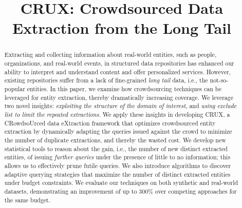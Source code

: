 \documentclass[conference]{IEEEtran}
\begin{document}

\title{CRUX: Crowdsourced Data Extraction from the Long Tail}
%

\author{
\and
{}
\and
{}
}

\maketitle

\begin{abstract}
Extracting and collecting information about real-world entities, such as people, organizations, and real-world events, in structured data repositories has enhanced our ability to interpret and understand content and offer personalized services. However, existing repositories suffer from a lack of fine-grained {\em long tail} data, i.e., the not-so-popular entities. In this paper, we examine how crowdsourcing techniques can be leveraged for entity extraction, thereby dramatically increasing coverage. We leverage two novel insights: {\em exploiting the structure of the domain of interest}, and {\em using exclude list to limit the repeated extractions}. We apply these insights in developing CRUX, a CRowdsoUrced data eXtraction framework that optimizes crowdsourced entity extraction by dynamically adapting the queries issued against the crowd to minimize the number of duplicate extractions, and thereby the wasted cost. We develop new statistical tools to reason about the gain, i.e., the number of new distinct extracted entities, of issuing {\em further queries} under the presence of little to no information; this allows us to effectively prune futile queries. We also introduce algorithms to discover adaptive querying strategies that maximize the number of distinct extracted entities under budget constraints. We evaluate our techniques on both synthetic and real-world datasets, demonstrating an improvement of up to 300\% over competing approaches for the same budget.
\end{abstract}
\end{document}
